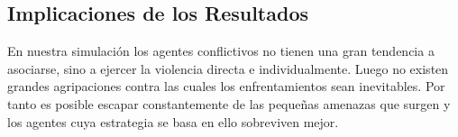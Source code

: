 \documentclass[11pt]{article}
\begin{document}


\subsection{Implicaciones de los Resultados}
En nuestra simulación los agentes conflictivos no tienen una gran tendencia a asociarse, sino a ejercer la violencia directa e individualmente.
Luego no existen grandes agripaciones contra las cuales los enfrentamientos sean inevitables. Por tanto es posible escapar constantemente de las pequeñas amenazas que surgen y los agentes cuya estrategia se basa en ello sobreviven mejor.
\end{document}
